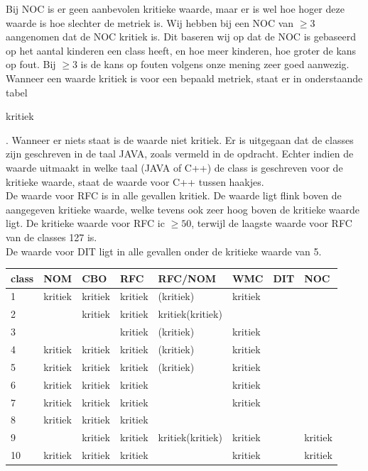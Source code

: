 \documentclass[a4paper,titlepage]{artikel1}
\begin{document}
\begin{itemize}
       Bij NOC is er geen aanbevolen kritieke waarde, maar er is wel hoe hoger deze waarde is hoe slechter de metriek is. Wij hebben bij een NOC van $\geq3$ aangenomen dat de NOC kritiek is. Dit baseren wij op dat de NOC is gebaseerd op het aantal kinderen een class heeft, en hoe meer kinderen, hoe groter de kans op fout. Bij $\geq3$ is de kans op fouten volgens onze mening zeer goed aanwezig.\\
       Wanneer een waarde kritiek is voor een bepaald metriek, staat er in onderstaande tabel \begin{em}kritiek\end{em}. Wanneer er niets staat is de waarde niet kritiek. Er is uitgegaan dat de classes zijn geschreven in de taal JAVA, zoals vermeld in de opdracht. Echter indien de waarde uitmaakt in welke taal (JAVA of C++) de class is geschreven voor de kritieke waarde, staat de waarde voor C++ tussen haakjes. \\ 
         De waarde voor RFC is in alle gevallen kritiek. De waarde ligt flink boven de aangegeven kritieke waarde, welke tevens ook zeer hoog boven de kritieke waarde ligt. De kritieke waarde voor RFC ic $\geq50$, terwijl de laagste waarde voor RFC van de classes 127 is. \\
         De waarde voor DIT ligt in alle gevallen onder de kritieke waarde van 5. 
       \begin{center}
       \begin{tabular}{|l|l|l|l|l|l|l|l|}
         \hline
         class & NOM & CBO & RFC & RFC/NOM & WMC & DIT & NOC \\
         \hline
         1 & kritiek & kritiek & kritiek & (kritiek) & kritiek &  &  \\
         2 &  & kritiek & kritiek & kritiek(kritiek) &  &  &  \\
         3 &  &  & kritiek & (kritiek) & kritiek &  & \\
         4 & kritiek & kritiek & kritiek & (kritiek)& kritiek &  &  \\
         5 & kritiek & kritiek & kritiek & (kritiek) & kritiek &  &  \\
         6 & kritiek & kritiek & kritiek &  & kritiek &  &  \\
         7 & kritiek & kritiek  & kritiek &  & kritiek &  &  \\
         8 & kritiek & kritiek & kritiek &  &  &  &  \\
         9 &  & kritiek & kritiek & kritiek(kritiek) & kritiek &  & kritiek \\
         10 & kritiek & kritiek & kritiek &  & kritiek &  & kritiek \\
         \hline
       \end{tabular}
       \end{center}

   \end{itemize}
   
\end{document}
